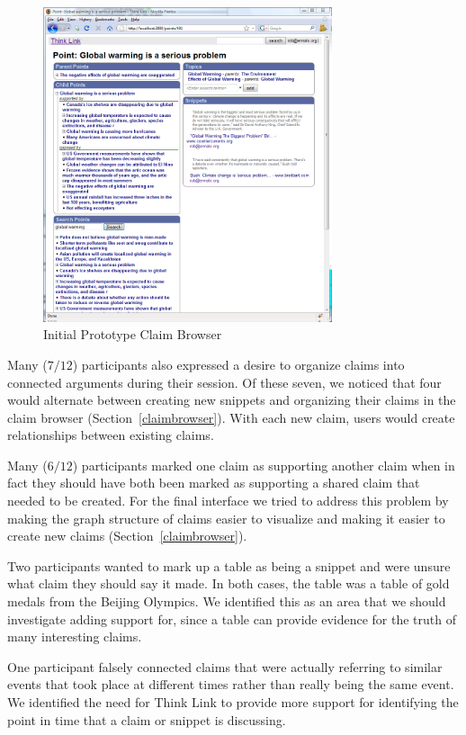 \documentclass{chi2009}
\begin{document}
\begin{figure}[ht]
	\includegraphics[width=8.5cm]{../screenshots/oldpoint_search.png}
	\caption{Initial Prototype Claim Browser}
	\label{oldbrowser}
\end{figure}

Many ($7/12$) participants also expressed a desire to organize claims into connected arguments during their session. Of these seven, we noticed that four would alternate between creating new snippets and organizing their claims in the claim browser (Section~\ref{claimbrowser}). With each new claim, users would create relationships between existing claims.

Many ($6/12$) participants marked one claim as supporting another claim when in fact they should have both been marked as supporting a shared claim that needed to be created. For the final interface we tried to address this problem by making the graph structure of claims easier to visualize and making it easier to create new claims (Section~\ref{claimbrowser}).

Two participants wanted to mark up a table as being a snippet and were unsure what claim they should say it made. In both cases, the table was a table of gold medals from the Beijing Olympics. We identified this as an area that we should investigate adding support for, since a table can provide evidence for the truth of many interesting claims.

One participant falsely connected claims that were actually referring to similar events that took place at different times rather than really being the same event. We identified the need for Think Link to provide more support for identifying the point in time that a claim or snippet is discussing.
\end{document}
